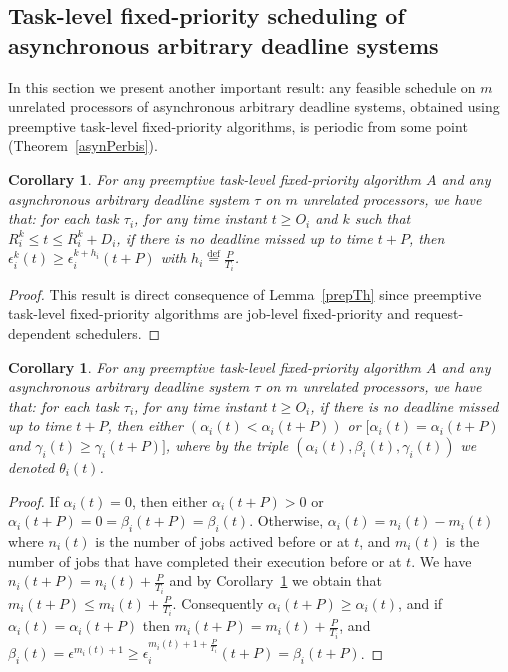 \documentclass[a4paper,11pt]{article}
\newtheorem{Corollary}[Theorem]{Corollary}
\newcommand{\equals}{\stackrel{\mathrm{def}}{=}}
\begin{document}
\subsection{Task-level fixed-priority scheduling of asynchronous arbitrary 
  deadline systems} \label{asynSectArb}

In this section we present another important result: any feasible schedule on
$m$ unrelated processors of asynchronous arbitrary deadline systems,
obtained using preemptive task-level fixed-priority algorithms, is periodic from
some point (Theorem~\ref{asynPerbis}).

\begin{Corollary}\label{prepThbis} 
  For any preemptive task-level fixed-priority algorithm $A$ and any asynchronous
  arbitrary deadline system $\tau$ on $m$ unrelated processors, we
  have that: for each task $\tau_i$, for any time instant $t \geq O_i$
  and $k$ such that $R_i^k \leq t \leq R_i^k+D_i$, if there is no
  deadline missed up to time $t+P$, then $\epsilon_{i}^{k}(t) \geq
  \epsilon_{i}^{k+h_i}(t+P)$ with $h_i \equals \frac{P}{T_i}$.
\end{Corollary}

\begin{proof}
  This result is direct consequence of Lemma~\ref{prepTh} since preemptive
  task-level fixed-priority algorithms are job-level fixed-priority and request-dependent schedulers.
\end{proof}





\begin{Corollary} \label{Coreither}
  For any preemptive task-level fixed-priority algorithm $A$ and any asynchronous
  arbitrary deadline system $\tau$ on $m$ unrelated processors, we
  have that: for each task $\tau_i$, for any time instant $t \geq
  O_i$, if there is no deadline missed up to time $t+P$, then either
  $(\alpha_i(t) < \alpha_i(t+P))$ or $[\alpha_i(t)= \alpha_i(t+P)$ and
  $\gamma_i(t) \geq \gamma_i(t+P)]$, where by the triple 
  $(\alpha_i(t), \beta_i(t), \gamma_i(t))$ we denoted $\theta_i(t)$.
\end{Corollary}

\begin{proof} If $\alpha_i(t)=0$, then either $\alpha_i(t+P) > 0$ or
  $\alpha_i(t+P)=0=\beta_i(t+P)= \beta_i(t)$. Otherwise,
  $\alpha_i(t)=n_i(t) - m_i(t)$ where $n_i(t)$ is the number of jobs
  actived before or at $t$, and $m_i(t)$ is the number of jobs that
  have completed their execution before or at $t$. We have
  $n_i(t+P)=n_i(t)+ \frac{P}{T_i}$ and by Corollary~\ref{prepThbis} we
  obtain that $m_i(t+P) \leq m_i(t) + \frac{P}{T_i}$. Consequently
  $\alpha_i(t+P)\geq \alpha_i(t)$, and if $\alpha_i(t)=\alpha_i(t+P)$
  then $m_i(t+P)= m_i(t)+ \frac{P}{T_i}$, and $\beta_i(t)=
  \epsilon^{m_i(t)+1} \geq
  \epsilon_i^{m_i(t)+1+\frac{P}{T_i}}(t+P)=\beta_i(t+P)$.
\end{proof}
\end{document}
